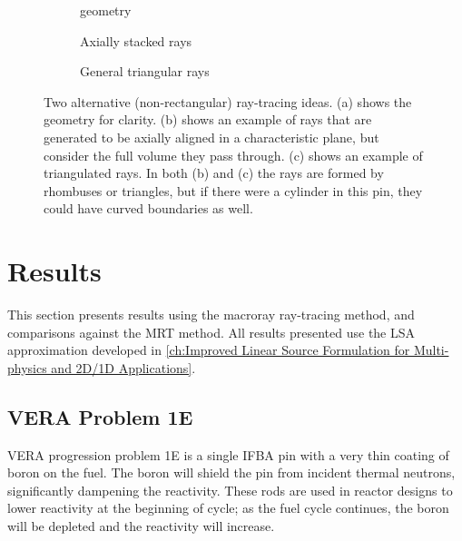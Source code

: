 {{{{        \begin{figure}[h]
          \centering
          \begin{subfigure}[t]{0.32\textwidth}
            \centering
            \def\svgwidth{0.85\linewidth}
            
            \caption{geometry\label{fig:MR:Alternatives:Geom}}
          \end{subfigure}%
          \begin{subfigure}[t]{0.32\textwidth}
            \centering
            \def\svgwidth{0.85\linewidth}
            
            \caption{Axially stacked rays\label{fig:MR:Alternative 1}}
          \end{subfigure}%
          \begin{subfigure}[t]{0.32\textwidth}
            \centering
            \def\svgwidth{0.85\linewidth}
            
            \caption{General triangular rays\label{fig:MR:Alternative 2}}
          \end{subfigure}
          \caption{
            Two alternative (non-rectangular) ray-tracing ideas.
            (a) shows the geometry for clarity.
            (b) shows an example of rays that are generated to be axially aligned in a characteristic plane, but consider the full volume they pass through.
            (c) shows an example of triangulated rays.
            In both (b) and (c) the rays are formed by rhombuses or triangles, but if there were a cylinder in this pin, they could have curved boundaries as well.
          }
          \label{figs:MR:Alternatives}
        \end{figure}
      }
    }
  }

  \section{Results}{\label{sec:MR:Results}
    This section presents results using the macroray ray-tracing method, and comparisons against the \acf{MRT} method.
    All results presented use the \ac{LSA} approximation developed in \cref{ch:Improved Linear Source Formulation for Multi-physics and 2D/1D Applications}.

    \subsection{VERA Problem 1E}{\label{ssec:MR:VERA Problem 1E}
      \ac{VERA} progression problem 1E \cite{VERAProblems} is a single \ac{IFBA} pin with a very thin coating of boron on the fuel.
      The boron will shield the pin from incident thermal neutrons, significantly dampening the reactivity.
      These rods are used in reactor designs to lower reactivity at the beginning of cycle; as the fuel cycle continues, the boron will be depleted and the reactivity will increase.

}}}
